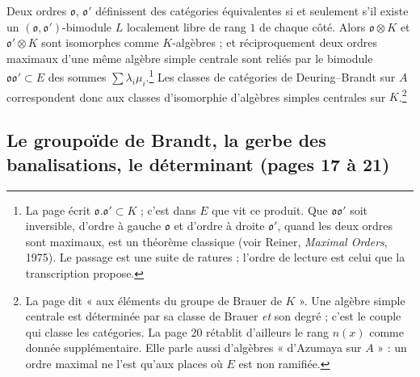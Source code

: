 \documentclass[11pt,a4paper]{article}
\begin{document}
Deux ordres $\mathfrak{o}$, $\mathfrak{o}'$ définissent des catégories
équivalentes si et seulement s'il existe un $(\mathfrak{o},
\mathfrak{o}')$-bimodule $L$ localement libre de rang $1$ de chaque côté.
Alors $\mathfrak{o} \otimes K$ et $\mathfrak{o}' \otimes K$ sont isomorphes
comme $K$-algèbres ; et réciproquement deux ordres maximaux d'une même algèbre
simple centrale sont reliés par le bimodule $\mathfrak{o}\mathfrak{o}' \subset E$
des sommes $\sum \lambda_{i}\mu_{i}$.\footnote{La page écrit
$\mathfrak{o}.\mathfrak{o}' \subset K$ ; c'est dans $E$ que vit ce produit. Que
$\mathfrak{o}\mathfrak{o}'$ soit inversible, d'ordre à gauche $\mathfrak{o}$ et
d'ordre à droite $\mathfrak{o}'$, quand les deux ordres sont maximaux, est un
théorème classique (voir Reiner, \emph{Maximal Orders}, 1975). Le passage est une
suite de ratures ; l'ordre de lecture est celui que la transcription propose.}
Les classes de catégories de Deuring--Brandt sur $A$ correspondent donc aux
classes d'isomorphie d'algèbres simples centrales sur $K$.\footnote{La page dit
« aux éléments du groupe de Brauer de $K$ ». Une algèbre simple centrale est
déterminée par sa classe de Brauer \emph{et} son degré ; c'est le couple qui
classe les catégories. La page 20 rétablit d'ailleurs le rang $n(x)$ comme donnée
supplémentaire. Elle parle aussi d'algèbres « d'Azumaya sur $A$ » : un ordre
maximal ne l'est qu'aux places où $E$ est non ramifiée.}

\subsection*{Le groupoïde de Brandt, la gerbe des banalisations, le déterminant (pages 17 à 21)}
\end{document}
